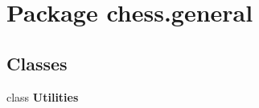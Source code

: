 \section{Package chess.\+general}
\label{namespacechess_1_1general}
\subsection*{Classes}
\begin{DoxyCompactItemize}
\item 
class {\bf Utilities}
\end{DoxyCompactItemize}
